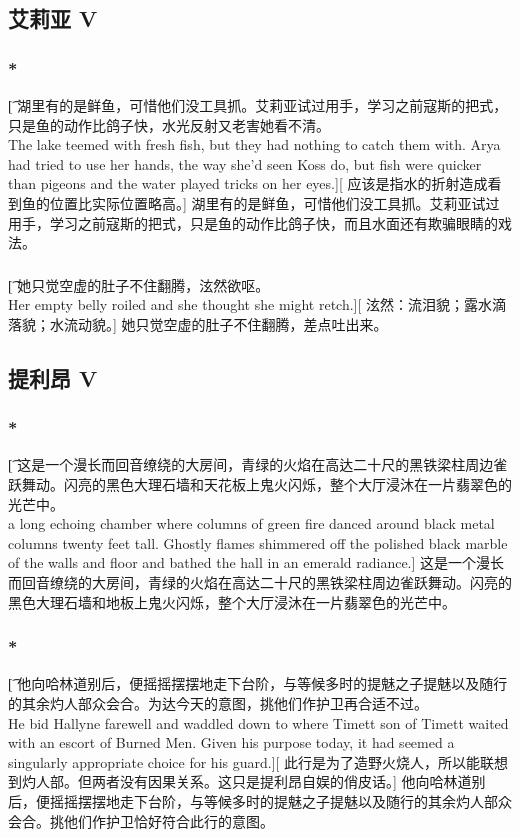 \documentclass[12pt,a4paper]{article}
\begin{document}
\subsection{艾莉亚 V}
\subsubsection{\color{red}*}\t[
	湖里有的是鲜鱼，可惜他们没工具抓。艾莉亚试过用手，学习之前寇斯的把式，只是鱼的动作比鸽子快，水光反射又老害她看不清。\\
	The lake teemed with fresh fish, but they had nothing to catch them with. Arya had tried to use her hands, the way she'd seen Koss do, but fish were quicker than pigeons and the water played tricks on her eyes.][
	应该是指水的折射造成看到鱼的位置比实际位置略高。]
	湖里有的是鲜鱼，可惜他们没工具抓。艾莉亚试过用手，学习之前寇斯的把式，只是鱼的动作比鸽子快，而且水面还有欺骗眼睛的戏法。
\subsubsection{}\t[
	 她只觉空虚的肚子不住翻腾，泫然欲呕。\\
	 Her empty belly roiled and she thought she might retch.][
	 泫然：流泪貌；露水滴落貌；水流动貌。]
	 她只觉空虚的肚子不住翻腾，差点吐出来。
	 	
\subsection{提利昂 V}
\subsubsection{\color{red}*}\t[
	这是一个漫长而回音缭绕的大房间，青绿的火焰在高达二十尺的黑铁梁柱周边雀跃舞动。闪亮的黑色大理石墙和天花板上鬼火闪烁，整个大厅浸沐在一片翡翠色的光芒中。\\
	a long echoing chamber where columns of green fire danced around black metal columns twenty feet tall. Ghostly flames shimmered off the polished black marble of the walls and floor and bathed the hall in an emerald radiance.]
	这是一个漫长而回音缭绕的大房间，青绿的火焰在高达二十尺的黑铁梁柱周边雀跃舞动。闪亮的黑色大理石墙和地板上鬼火闪烁，整个大厅浸沐在一片翡翠色的光芒中。
	
\subsubsection{\color{red}*}\t[
	他向哈林道别后，便摇摇摆摆地走下台阶，与等候多时的提魅之子提魅以及随行的其余灼人部众会合。为达今天的意图，挑他们作护卫再合适不过。\\
	He bid Hallyne farewell and waddled down to where Timett son of Timett waited with an escort of Burned Men. Given his purpose today, it had seemed a singularly appropriate choice for his guard.][
	此行是为了造野火烧人，所以能联想到灼人部。但两者没有因果关系。这只是提利昂自娱的俏皮话。]
	他向哈林道别后，便摇摇摆摆地走下台阶，与等候多时的提魅之子提魅以及随行的其余灼人部众会合。挑他们作护卫恰好符合此行的意图。
	
\end{document}
